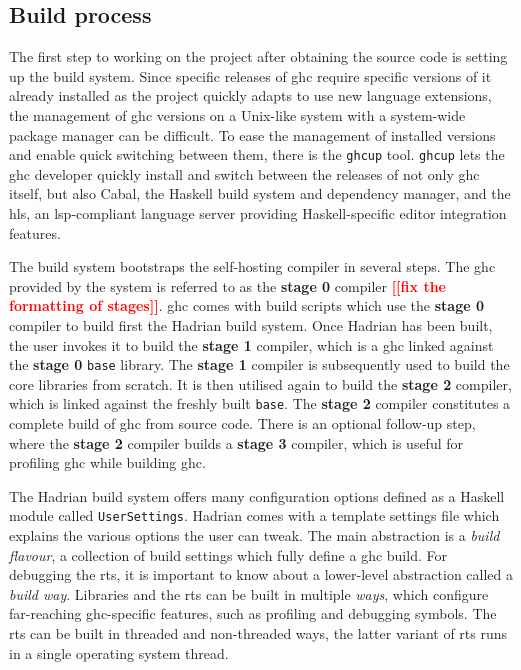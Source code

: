 \documentclass[thesis=B,english]{FITthesis}[2019/12/23]
\newcommand{\todo}[1]{\textcolor{red}{\textbf{[[#1]]}}}
\newcommand{\hackage}[1]{\texttt{#1}}
\newcommand{\hsModule}[1]{\texttt{#1}}
\begin{document}
\subsection*{Build process}
The first step to working on the project after obtaining the source code is
setting up the build system. Since specific releases of \acrshort{ghc} require
specific versions of it already installed as the project quickly adapts to use
new language extensions, the management of \acrshort{ghc} versions on a
Unix-like system with a system-wide package manager can be difficult. To ease
the management of installed versions and enable quick switching between them,
there is the \texttt{ghcup} tool\cite{ghcup}. \texttt{ghcup} lets the
\acrshort{ghc} developer quickly install and switch between the releases of not
only \acrshort{ghc} itself, but also Cabal, the Haskell build system and
dependency manager, and the \acrfull{hls}, an \acrshort{lsp}-compliant language
server providing Haskell-specific editor integration features.

The build system bootstraps the self-hosting compiler in several steps. The
\acrshort{ghc} provided by the system is referred to as the \textbf{stage 0}
compiler \todo{fix the formatting of stages}. \acrshort{ghc} comes with build
scripts which use the \textbf{stage 0} compiler to build first the Hadrian
build system. Once Hadrian has been built, the user invokes it to build the
\textbf{stage 1} compiler, which is a \acrshort{ghc} linked against the
\textbf{stage 0} \hackage{base} library. The \textbf{stage 1} compiler is
subsequently used to build the core libraries from scratch. It is then utilised
again to build the \textbf{stage 2} compiler, which is linked against the
freshly built \hackage{base}. The \textbf{stage 2} compiler constitutes a
complete build of \acrshort{ghc} from source code. There is an optional
follow-up step, where the \textbf{stage 2} compiler builds a \textbf{stage 3}
compiler, which is useful for profiling \acrshort{ghc} while building
\acrshort{ghc}.

The Hadrian build system offers many configuration options defined as a Haskell
module called \hsModule{UserSettings}. Hadrian comes with a template settings
file which explains the various options the user can tweak. The main
abstraction is a \textit{build flavour}, a collection of build settings which
fully define a \acrshort{ghc} build. For debugging the \acrshort{rts}, it is
important to know about a lower-level abstraction called a \textit{build way}.
Libraries and the \acrshort{rts} can be built in multiple \textit{ways}, which
configure far-reaching \acrshort{ghc}-specific features, such as profiling and
debugging symbols. The \acrshort{rts} can be built in threaded and non-threaded
ways, the latter variant of \acrshort{rts} runs in a single operating system
thread.
\end{document}
